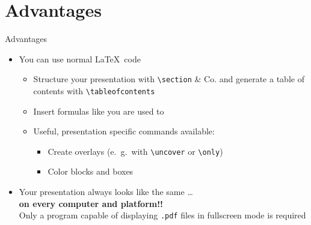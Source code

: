 \documentclass[11pt]{beamer}
\begin{document}
	\section{Advantages}
	\begin{frame}[fragile]{Advantages}
		\begin{itemize}
			\item You can use normal \LaTeX\ code
			\begin{itemize}
				\item Structure your presentation with \verb|\section| \& Co. and generate a table of contents with \verb|\tableofcontents|
				\item Insert formulas like you are used to
				\item Useful, presentation specific commands available:
				\begin{itemize}
					\item Create overlays (e.~g.~with \verb|\uncover| or \verb|\only|)
					\item Color blocks and boxes
				\end{itemize}
			\end{itemize}
			\item Your presentation always looks like the same \dots \\
			\textbf{on every computer and platform!!} \\
			Only a program capable of displaying \texttt{.pdf} files in fullscreen mode is required
		\end{itemize}
	\end{frame}
\end{document}
